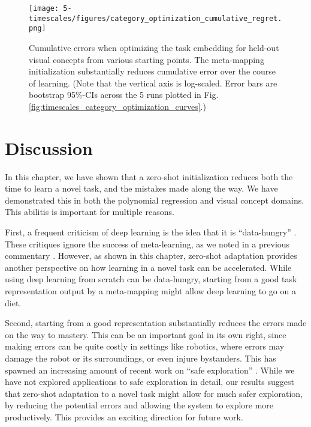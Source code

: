 \begin{figure}
\centering
\texttt{[image: 5-timescales/figures/category\_optimization\_cumulative\_regret.png]}
\caption[Cumulative errors when optimizing the task embedding for held-out visual concepts from various starting points.]{Cumulative errors when optimizing the task embedding for held-out visual concepts from various starting points. The meta-mapping initialization substantially reduces cumulative error over the course of learning. (Note that the vertical axis is log-scaled. Error bars are bootstrap 95\%-CIs across the 5 runs plotted in Fig. \ref{fig:timescales_category_optimization_curves}.)} \label{fig:timescales_category_optimization_regret}
\end{figure}

\section{Discussion}
In this chapter, we have shown that a zero-shot initialization reduces both the time to learn a novel task, and the mistakes made along the way. We have demonstrated this in both the polynomial regression and visual concept domains. This abilitis is important for multiple reasons. \par 
First, a frequent criticism of deep learning is the idea that it is ``data-hungry'' \citep[e.g.]{Lake2016, Marcus2018}. These critiques ignore the success of meta-learning, as we noted in a previous commentary \citep{Hansen2017}. However, as shown in this chapter, zero-shot adaptation provides another perspective on how learning in a novel task can be accelerated. While using deep learning from scratch can be data-hungry, starting from a good task representation output by a meta-mapping might allow deep learning to go on a diet. \par  
Second, starting from a good representation substantially reduces the errors made on the way to mastery. This can be an important goal in its own right, since making errors can be quite costly in settings like robotics, where errors may damage the robot or its surroundings, or even injure bystanders. This has spawned an increasing amount of recent work on ``safe exploration'' \citep[e.g.][]{Turchetta2016, Turchetta2019}. While we have not explored applications to safe exploration in detail, our results suggest that zero-shot adaptation to a novel task might allow for much safer exploration, by reducing the potential errors and allowing the system to explore more productively. This provides an exciting direction for future work. \par  
